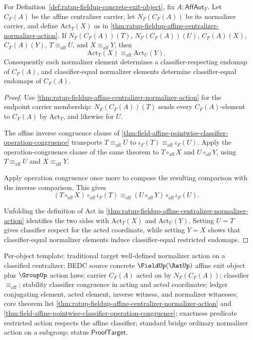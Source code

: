 

\begin{theorem}
\label{thm:ratup-fieldup-affine-centralizer-normalizer-action-classifier-congruence}
For Definition~\ref{def:ratup-fieldup-concrete-exit-object}, fix
$A:\mathsf{AffAut}_F$. Let $C_F(A)$ be the affine centralizer carrier, let
$N_F(C_F(A))$ be its normalizer carrier, and define $\mathrm{Act}_T(X)$ as in
\autoref{thm:ratup-fieldup-affine-centralizer-normalizer-action}. If
$N_F(C_F(A))(T)$, $N_F(C_F(A))(U)$, $C_F(A)(X)$, $C_F(A)(Y)$,
$T\equiv_{\mathrm{aff}}U$, and $X\equiv_{\mathrm{aff}}Y$, then
$$
\mathrm{Act}_T(X)\equiv_{\mathrm{aff}}\mathrm{Act}_U(Y).
$$
Consequently each normalizer element determines a classifier-respecting endomap
of $C_F(A)$, and classifier-equal normalizer elements determine
classifier-equal endomaps of $C_F(A)$.
\end{theorem}
\begin{proof}
Use \autoref{thm:ratup-fieldup-affine-centralizer-normalizer-action} for the
endpoint carrier membership: $N_F(C_F(A))(T)$ sends every $C_F(A)$-element to
$C_F(A)$ by $\mathrm{Act}_T$, and likewise for $U$.

The affine inverse congruence clause of
\autoref{thm:field-affine-pointwise-classifier-operation-congruence} transports
$T\equiv_{\mathrm{aff}}U$ to
$\iota_F(T)\equiv_{\mathrm{aff}}\iota_F(U)$. Apply the operation-congruence
clause of the same theorem to $T\circ_{\mathrm{aff}}X$ and
$U\circ_{\mathrm{aff}}Y$, using $T\equiv_{\mathrm{aff}}U$ and
$X\equiv_{\mathrm{aff}}Y$.

Apply operation congruence once more to compose the resulting comparison with
the inverse comparison. This gives
$$
(T\circ_{\mathrm{aff}}X)\circ_{\mathrm{aff}}\iota_F(T)
\equiv_{\mathrm{aff}}
(U\circ_{\mathrm{aff}}Y)\circ_{\mathrm{aff}}\iota_F(U).
$$

Unfolding the definition of $\mathrm{Act}$ in
\autoref{thm:ratup-fieldup-affine-centralizer-normalizer-action} identifies
the two sides with $\mathrm{Act}_T(X)$ and $\mathrm{Act}_U(Y)$. Setting
$U=T$ gives classifier respect for the acted coordinate, while setting $Y=X$
shows that classifier-equal normalizer elements induce classifier-equal
restricted endomaps.
\end{proof}

Per-object template: traditional target well-defined normalizer action on a
classified centralizer; BEDC source concrete $\FieldUp(\RatUp)$ affine exit
object plus $\GroupUp$ action laws; carrier $C_F(A)$ acted on by
$N_F(C_F(A))$; classifier $\equiv_{\mathrm{aff}}$; stability classifier
congruence in acting and acted coordinates; ledger conjugating element, acted
element, inverse witness, and normalizer witnesses; core theorem list
\autoref{thm:ratup-fieldup-affine-centralizer-normalizer-action} and
\autoref{thm:field-affine-pointwise-classifier-operation-congruence};
exactness predicate restricted action respects the affine classifier; standard
bridge ordinary normalizer action on a subgroup; status $\mathsf{ProofTarget}$.

